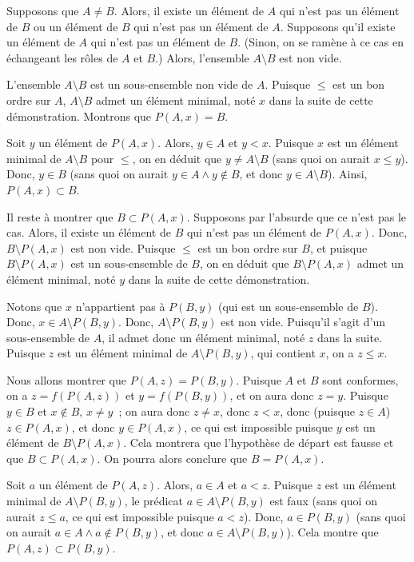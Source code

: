 \noindent{} 
    Supposons que $A \neq B$. 
    Alors, il existe un élément de $A$ qui n'est pas un élément de $B$ ou un élément de $B$ qui n'est pas un élément de $A$.
    Supposons qu'il existe un élément de $A$ qui n'est pas un élément de $B$. 
    (Sinon, on se ramène à ce cas en échangeant les rôles de $A$ et $B$.)
    Alors, l'ensemble $A \setminus B$ est non vide. 

    L'ensemble $A \setminus B$ est un sous-ensemble non vide de $A$. 
    Puisque $\leq$ est un bon ordre sur $A$, $A \setminus B$ admet un élément minimal, noté $x$ dans la suite de cette démonstration.
    Montrons que $P(A, x) = B$.

    Soit $y$ un élément de $P(A,x)$. 
    Alors, $y \in A$ et $y < x$.
    Puisque $x$ est un élément minimal de $A \setminus B$ pour $\leq$, on en déduit que $y \neq A \setminus B$ (sans quoi on aurait $x \leq y$).
    Donc, $y \in B$ (sans quoi on aurait $y \in A \wedge y \notin B$, et donc $y \in A \setminus B$).
    Ainsi, $P(A,x) \subset B$.

    Il reste à montrer que $B \subset P(A,x)$. 
    Supposons par l'absurde que ce n'est pas le cas. 
    Alors, il existe un élément de $B$ qui n'est pas un élément de $P(A,x)$. 
    Donc, $B \setminus P(A, x)$ est non vide.
    Puisque $\leq$ est un bon ordre sur $B$, et puisque $B \setminus P(A,x)$ est un sous-ensemble de $B$, on en déduit que $B \setminus P(A,x)$ admet un élément minimal, noté $y$ dans la suite de cette démonstration.

    Notons que $x$ n'appartient pas à $P(B, y)$ (qui est un sous-ensemble de $B$). 
    Donc, $x \in A \setminus P(B,y)$. 
    Donc, $A \setminus P(B,y)$ est non vide. 
    Puisqu'il s'agit d'un sous-ensemble de $A$, il admet donc un élément minimal, noté $z$ dans la suite. 
    Puisque $z$ est un élément minimal de $A \setminus P(B,y)$, qui contient $x$, on a $z \leq x$. 

    Nous allons montrer que $P(A,z) = P(B,y)$. 
    Puisque $A$ et $B$ sont conformes, on a $z = f(P(A,z))$ et $y = f(P(B,y))$, et on aura donc $z = y$.
    Puisque $y \in B$ et $x \notin B$, $x \neq y$ ; on aura donc $z \neq x$, donc $z < x$, donc (puisque $z \in A$) $z \in P(A,x)$, et donc $y \in P(A,x)$, ce qui est impossible puisque $y$ est un élément de $B \setminus P(A,x)$. 
    Cela montrera que l'hypothèse de départ est fausse et que $B \subset P(A,x)$. 
    On pourra alors conclure que $B = P(A,x)$.

    Soit $a$ un élément de $P(A,z)$. 
    Alors, $a \in A$ et $a < z$. 
    Puisque $z$ est un élément minimal de $A \setminus P(B,y)$, le prédicat $a \in A \setminus P(B,y)$ est faux (sans quoi on aurait $z \leq a$, ce qui est impossible puisque $a < z$).
    Donc, $a \in P(B,y)$ (sans quoi on aurait $a \in A \wedge a \notin P(B,y)$, et donc $a \in A \setminus P(B,y)$).
    Cela montre que $P(A,z) \subset P(B,y)$.

